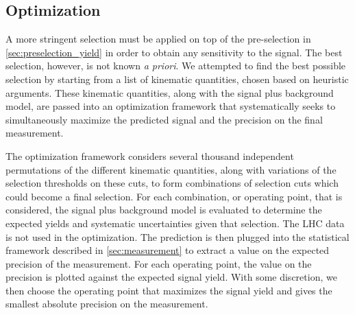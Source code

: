 \subsection{Optimization}
\label{sec:optimization}

A more stringent selection must be applied on top of the pre-selection
in \sec\ref{sec:preselection_yield} in order to obtain any
sensitivity to the signal.  The best selection, however, is
not known \emph{a priori}. We attempted to find the best possible selection
by starting from a list of kinematic quantities, chosen based on heuristic
arguments. These kinematic quantities, along with the signal
plus background model, are passed into an optimization 
framework that systematically seeks to simultaneously 
maximize the predicted signal and the precision on the final measurement.

The optimization framework considers several thousand
independent permutations of the different
kinematic quantities, along with variations of the selection thresholds
on these cuts, to form combinations of selection cuts which could become a final
selection. For each combination, or operating point,
that is considered, the signal plus background
model is evaluated to determine the expected yields and systematic
uncertainties given that selection.  The LHC data is not used in the optimization.  
The prediction is then plugged into the statistical framework described in
\sec\ref{sec:measurement} to extract a value on the expected precision
of the measurement. For each operating point,
the value on the precision is plotted against the expected signal yield.
With some discretion, we then choose the operating point 
that maximizes the signal yield and gives the smallest absolute 
precision on the measurement. 




